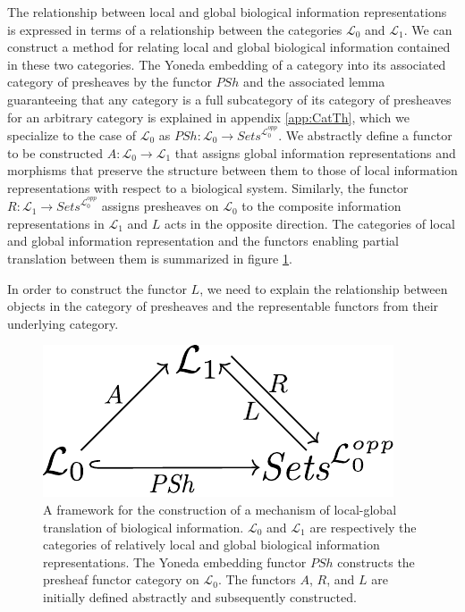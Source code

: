 \documentclass[aps,twocolumn]{revtex4-1}
\begin{document}
The relationship between local and global biological information representations is expressed in terms of a relationship between the categories $\mathcal{L}_0$ and $\mathcal{L}_1$. We can construct a method for relating local and global biological information contained in these two categories. The Yoneda embedding of a category into its associated category of presheaves by the functor $PSh$ and the associated lemma guaranteeing that any category is a full subcategory of its category of presheaves for an arbitrary category is explained in appendix \ref{app:CatTh}, which we specialize to the case of $\mathcal{L}_0$ as $PSh: \mathcal{L}_0 \rightarrow \textit{Sets}^{\mathcal{L}_0^{opp}}$. We abstractly define a functor to be constructed $A:\mathcal{L}_0 \rightarrow \mathcal{L}_1$ that assigns global information representations and morphisms that preserve the structure between them to those of local information representations with respect to a biological system.  Similarly, the functor $R: \mathcal{L}_1 \rightarrow \textit{Sets}^{\mathcal{L}_0^{opp}}$ assigns presheaves on $\mathcal{L}_0$ to the composite information representations in $\mathcal{L}_1$ and $L$ acts in the opposite direction. The categories of local and global information representation and the functors enabling partial translation between them is summarized in figure \ref{fig:ascent}.

In order to construct the functor $L$, we need to explain the relationship between objects in the category of presheaves and the representable functors from their underlying category.

\begin{figure}
\noindent\includegraphics[width=0.5\columnwidth]{fig/ascent.pdf}
\caption{A framework for the construction of a mechanism of local-global translation of biological information. $\mathcal{L}_0$ and $\mathcal{L}_1$ are respectively the categories of relatively local and global biological information representations. The Yoneda embedding functor $PSh$ constructs the presheaf functor category on $\mathcal{L}_0$. The functors $A$, $R$, and $L$ are initially defined abstractly and subsequently constructed.}
\label{fig:ascent}
\end{figure}
\end{document}
